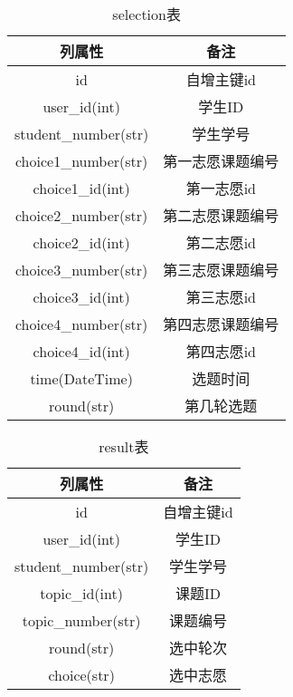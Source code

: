 \begin{table}[ht]
    \centering
    \caption{selection表}
    \begin{tabular}{|c|c|}
        \hline
        列属性                  & 备注       \\
        \hline
        id                   & 自增主键id   \\
        \hline
        user\_id(int)        & 学生ID     \\
        \hline
        student\_number(str) & 学生学号     \\
        \hline
        choice1\_number(str) & 第一志愿课题编号 \\
        \hline
        choice1\_id(int)     & 第一志愿id   \\
        \hline
        choice2\_number(str) & 第二志愿课题编号 \\
        \hline
        choice2\_id(int)     & 第二志愿id   \\
        \hline
        choice3\_number(str) & 第三志愿课题编号 \\
        \hline
        choice3\_id(int)     & 第三志愿id   \\
        \hline
        choice4\_number(str) & 第四志愿课题编号 \\
        \hline
        choice4\_id(int)     & 第四志愿id   \\
        \hline
        time(DateTime)       & 选题时间     \\
        \hline
        round(str)           & 第几轮选题    \\
        \hline
    \end{tabular}
    
    \label{tab:selection}
\end{table}

\begin{table}[ht]
    \centering
    \caption{result表}
    \begin{tabular}{|c|c|}
        \hline
        列属性                  & 备注     \\
        \hline
        id                   & 自增主键id \\
        \hline
        user\_id(int)        & 学生ID   \\
        \hline
        student\_number(str) & 学生学号   \\
        \hline
        topic\_id(int)       & 课题ID   \\
        \hline
        topic\_number(str)   & 课题编号   \\
        \hline
        round(str)           & 选中轮次   \\
        \hline
        choice(str)          & 选中志愿   \\
        \hline
    \end{tabular}
    
    \label{tab:result}
\end{table}

\clearpage